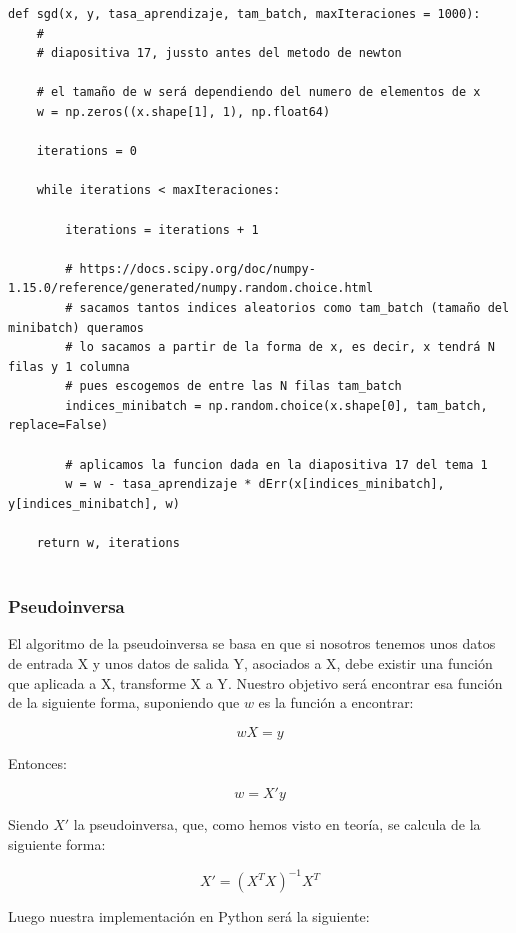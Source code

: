 \documentclass[12pt, spanish]{article}
\begin{document}
\begin{lstlisting}
def sgd(x, y, tasa_aprendizaje, tam_batch, maxIteraciones = 1000):
    #
	# diapositiva 17, jussto antes del metodo de newton

	# el tamaño de w será dependiendo del numero de elementos de x
	w = np.zeros((x.shape[1], 1), np.float64)

	iterations = 0

	while iterations < maxIteraciones:

		iterations = iterations + 1

		# https://docs.scipy.org/doc/numpy-1.15.0/reference/generated/numpy.random.choice.html
		# sacamos tantos indices aleatorios como tam_batch (tamaño del minibatch) queramos
		# lo sacamos a partir de la forma de x, es decir, x tendrá N filas y 1 columna
		# pues escogemos de entre las N filas tam_batch
		indices_minibatch = np.random.choice(x.shape[0], tam_batch, replace=False)

		# aplicamos la funcion dada en la diapositiva 17 del tema 1
		w = w - tasa_aprendizaje * dErr(x[indices_minibatch], y[indices_minibatch], w)

	return w, iterations
	
\end{lstlisting}


\subsubsection{Pseudoinversa}

El algoritmo de la pseudoinversa se basa en que si nosotros tenemos unos datos de entrada X y unos datos de salida Y, asociados a X, debe existir una función que aplicada a X, transforme X a Y\cite{teoria}. Nuestro objetivo será encontrar esa función de la siguiente forma, suponiendo que $w$ es la función a encontrar:

$$ wX = y $$

Entonces:

$$ w = X'y $$

Siendo $X'$ la pseudoinversa, que, como hemos visto en teoría, se calcula de la siguiente forma:

$$ X' = (X^TX)^{-1}X^T $$

Luego nuestra implementación en Python será la siguiente:
\end{document}
